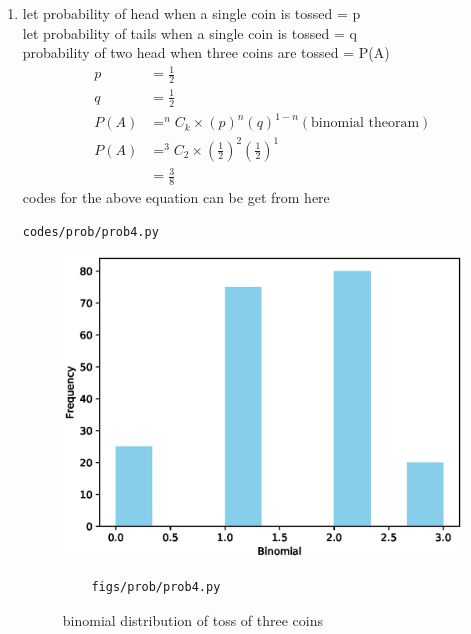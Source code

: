 \renewcommand{\theequation}{\theenumi}
\begin{enumerate}[label=\arabic*.,ref=\thesubsection.\theenumi]
\item let probability of head when a single coin is tossed = p
\\
let probability of tails when a single coin is tossed = q
\\
probability of two head when three coins are tossed = P(A)
\begin{align}
p &= \frac{1}{2}
\\
q &= \frac{1}{2}
\\
P(A) &= ^nC_k \times \left(p\right)^n \left(q\right)^{1-n}\left(\text{binomial theoram}\right)
\\
P(A) &= ^3C_2 \times \left(\frac{1}{2}\right)^2 \left(\frac{1}{2}\right)^1
\\
&= \frac{3}{8}
\end{align}
codes for the above equation can be get from here
\begin{lstlisting}
codes/prob/prob4.py
\end{lstlisting}
\begin{figure}[!ht]
	\centering
	\includegraphics[width=\columnwidth]{./figures/prob/prob4.eps}
	\caption{binomial distribution of toss of three coins }
	\label{fig:bt2}
	\begin{lstlisting}
	figs/prob/prob4.py
	\end{lstlisting}
\end{figure}
\end{enumerate}